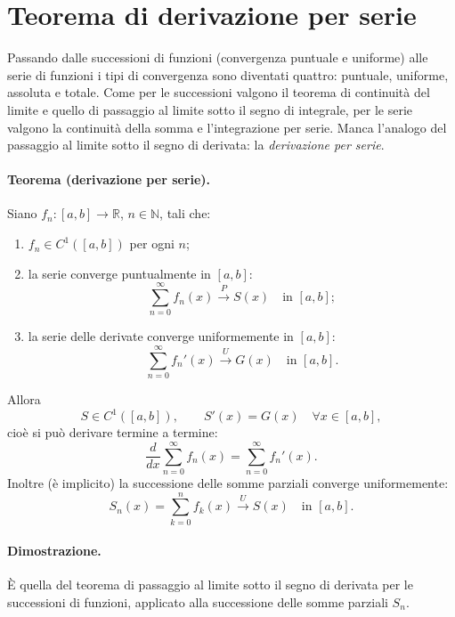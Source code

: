 
\section{Teorema di derivazione per serie}

Passando dalle successioni di funzioni (convergenza puntuale e uniforme) alle
serie di funzioni i tipi di convergenza sono diventati quattro: puntuale,
uniforme, assoluta e totale. Come per le successioni valgono il teorema di
continuità del limite e quello di passaggio al limite sotto il segno di
integrale, per le serie valgono la continuità della somma e l'integrazione per
serie. %
Manca l'analogo del passaggio al limite sotto il segno di derivata: la
\emph{derivazione per serie}.

\paragraph{Teorema (derivazione per serie).} Siano $f_n\colon[a,b]\to\mathbb{R}$,
$n\in\mathbb{N}$, tali che:
\begin{enumerate}
  \item $f_n\in C^1([a,b])$ per ogni $n$;
  \item la serie converge puntualmente in $[a,b]$:
  \[
    \sum_{n=0}^{\infty} f_n(x)\xrightarrow{\;P\;} S(x)\quad\text{in }[a,b];
  \]
  \item la serie delle derivate converge uniformemente in $[a,b]$:
  \[
    \sum_{n=0}^{\infty} f_n'(x)\xrightarrow{\;U\;} G(x)\quad\text{in }[a,b].
  \]
\end{enumerate}
Allora
\[
  S\in C^1([a,b]),\qquad S'(x)=G(x)\quad\forall x\in[a,b],
\]
cioè si può derivare termine a termine:
\[
  \frac{d}{dx}\sum_{n=0}^{\infty} f_n(x)=\sum_{n=0}^{\infty} f_n'(x).
\]
Inoltre (è implicito) la successione delle somme parziali converge
uniformemente:
\[
  S_n(x)=\sum_{k=0}^{n} f_k(x)\xrightarrow{\;U\;} S(x)\quad\text{in }[a,b].
\]

\paragraph{Dimostrazione.} %
È quella del teorema di passaggio al limite sotto il segno di derivata per le
successioni di funzioni, applicato alla successione delle somme parziali $S_n$.

